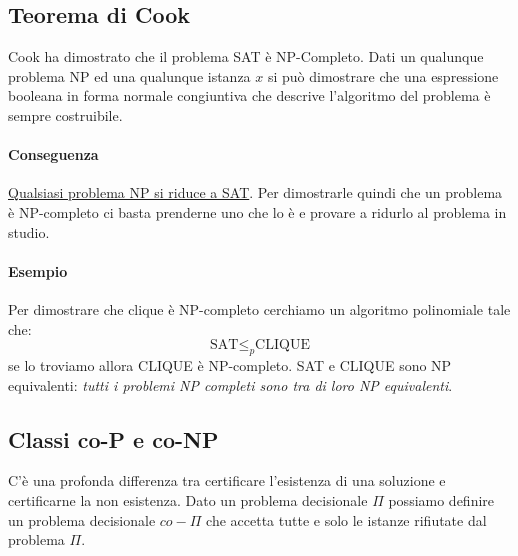 \subsection{Teorema di Cook}
Cook ha dimostrato che il problema SAT è NP-Completo. Dati un qualunque problema NP ed una qualunque istanza $x$ si può dimostrare che una espressione booleana in forma normale congiuntiva che descrive l'algoritmo del problema è sempre costruibile.

\paragraph{Conseguenza} \underline{Qualsiasi problema NP si riduce a SAT}. Per dimostrarle quindi che un problema è NP-completo ci basta prenderne uno che lo è e provare a ridurlo al problema in studio.

\paragraph{Esempio} Per dimostrare che clique è NP-completo cerchiamo un algoritmo polinomiale tale che:
$$ \text{SAT} \leq_{p} \text{CLIQUE} $$
se lo troviamo allora CLIQUE è NP-completo. SAT e CLIQUE sono NP equivalenti: \emph{tutti i problemi NP completi sono tra di loro NP equivalenti}.

\subsection{Classi co-P e co-NP}
C'è una profonda differenza tra certificare l'esistenza di una soluzione e certificarne la non esistenza. Dato un problema decisionale $\Pi$ possiamo definire un problema decisionale $co-\Pi$ che accetta tutte e solo le istanze rifiutate dal problema $\Pi$. 


